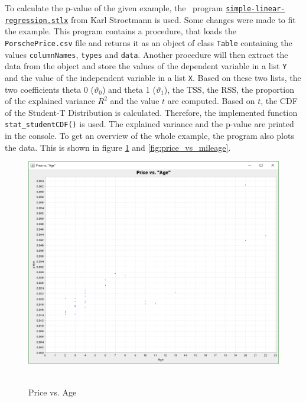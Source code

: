 	To calculate the p-value of the given example, the \setlx\ program \href{https://raw.githubusercontent.com/karlstroetmann/Artificial-Intelligence/master/SetlX/simple-linear-regression.stlx}{\lstinline{simple-linear-regression.stlx}} from Karl Stroetmann is used. Some changes were made to fit the example. This program contains a procedure, that loads the \lstinline{PorschePrice.csv} file and returns it as an object of class \lstinline{Table} containing the values \lstinline{columnNames}, \lstinline{types} and \lstinline{data}. Another procedure will then extract the data from the object and store the values of the dependent variable in a list \lstinline{Y} and the value of the independent variable in a list \lstinline{X}. Based on these two lists, the two coefficients theta 0 ($\vartheta _0$) and theta 1 ($\vartheta _1$), the \ac{TSS}, the \ac{RSS}, the proportion of the explained variance $R^{2}$ and the value $t$ are computed. Based on $t$, the \ac{CDF} of the Student-T Distribution is calculated. Therefore, the implemented function \lstinline{stat_studentCDF()} is used. The explained variance and the p-value are printed in the console. To get an overview of the whole example, the program also plots the data. This is shown in figure \ref{fig:price_vs_age} and \ref{fig:price_vs_mileage}.

	\begin{figure}[h]
		\centering
		\includegraphics[width=1\textwidth]{Figures/price_vs_age}~\\
		\caption{Price vs. Age}
		\label{fig:price_vs_age}
	\end{figure}

